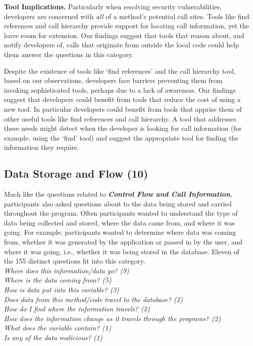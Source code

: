 \documentclass[conference]{IEEEtran}
\begin{document}
\noindent\textbf{Tool Implications.}
Particularly when resolving security vulnerabilities, developers are concerned with \textit{all} of a method's potential call sites.
Tools like find references and call hierarchy provide support for locating call information, yet the leave room for extension.
Our findings suggest that tools that reason about, and notify developers of, calls that originate from outside the local code could help them answer the questions in this category.

Despite the existence of tools like `find references' and the call hierarchy tool, based on our observations, developers face barriers preventing them from invoking sophisticated tools, perhaps due to a lack of awareness.
Our findings suggest that developers could benefit from tools that reduce the cost of using a new tool.
In particular developers could benefit from tools that apprise them of other useful tools like find references and call hierarchy.
A tool that addresses these needs might detect when the developer is looking for call information (for example, using the `find' tool) and suggest the appropriate tool for finding the information they require. 




\noindent\subsection{\textbf{Data Storage and Flow (10)}}\label{dsf}
Much like the questions related to \emph{\textbf{Control Flow and Call Information}}, participants also asked questions about to the data being stored and carried throughout the program. 
Often participants wanted to understand the type of data being collected and stored, where the data came from, and where it was going. 
For example, participants wanted to determine where data was coming from, whether it was generated by the application or passed in by the user, and where it was going, i.e., whether it was being stored in the database.
Eleven of the 155 distinct questions fit into this category.
\\

\noindent\emph{Where does this information/data go? (9)} \\
\emph{Where is the data coming from? (5)} \\
\emph{How is data put into this variable? (3)} \\
\emph{Does data from this method/code travel to the database? (2)} \\
\emph{How do I find where the information travels? (2)} \\
\emph{How does the information change as it travels through the programs? (2)} \\
\emph{What does the variable contain? (1)} \\
\emph{Is any of the data malicious? (1)} \\
\end{document}
